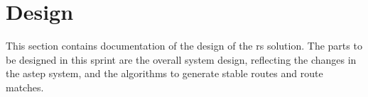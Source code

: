 \section{Design}

This section contains documentation of the design of the \gls{rs} solution.
The parts to be designed in this sprint are the overall system design, reflecting the changes in the \gls{astep} system, and the algorithms to generate stable routes and route matches.





